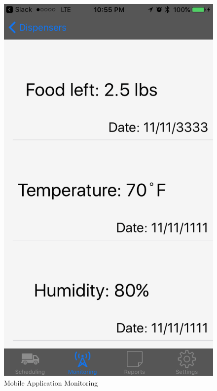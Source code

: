 \documentclass[12pt]{article}
\begin{document}
\begin{appendix}
  \begin{figure}[!htb]
    \begin{center}
        \includegraphics[scale=0.15]{Figures/iOSApp4.png}
    \end{center}
    \caption{Mobile Application Monitoring}
    \label{fig:iOSApp4}
  \end{figure}


\end{appendix}
\end{document}
